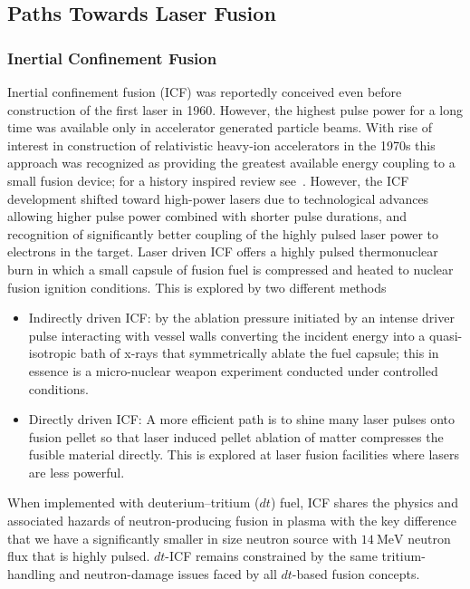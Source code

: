 \documentclass[particles,article,accept,pdftex,moreauthors]{Definitions/mdpi}
\begin{document}
\subsection{Paths Towards Laser Fusion}\label{ssec:INTlaserFusion}
\subsubsection{Inertial Confinement Fusion}\label{sssec:picoICF}
Inertial confinement fusion (ICF) was reportedly conceived even before construction of the first laser in 1960. However, the highest pulse power for a long time was available only in accelerator generated particle beams. With rise of interest in construction of relativistic heavy-ion accelerators in the 1970s this approach was recognized as providing the greatest available energy coupling to a small fusion device; for a history inspired review see~\cite{hofmann2018review}. However, the ICF development shifted toward high-power lasers due to technological advances allowing higher pulse power combined with shorter pulse durations, and recognition of significantly better coupling of the highly pulsed laser power to electrons in the target. Laser driven ICF offers a highly pulsed thermonuclear burn in which a small capsule of fusion fuel is compressed and heated to nuclear fusion ignition conditions. This is explored by two different methods~\cite{Hurricane:2023Review}
\begin{itemize}
\item 
Indirectly driven ICF: by the ablation pressure initiated by an intense driver pulse interacting with vessel walls converting the incident energy into a quasi-isotropic bath of x-rays that symmetrically ablate the fuel capsule; this in essence is a micro-nuclear weapon experiment conducted under controlled conditions.
\item 
Directly driven ICF: A more efficient path is to shine many laser pulses onto fusion pellet so that laser induced pellet ablation of matter compresses the fusible material directly. This is explored at laser fusion facilities where lasers are less powerful.
\end{itemize}

When implemented with deuterium--tritium ($dt$) fuel, ICF shares the physics and associated hazards of neutron-producing fusion in plasma with the key difference that we have a significantly smaller in size neutron source with $14~\mathrm{MeV}$ neutron flux that is highly pulsed. $dt$-ICF remains constrained by the same tritium-handling and neutron-damage issues faced by all $dt$-based fusion concepts. 
\end{document}
